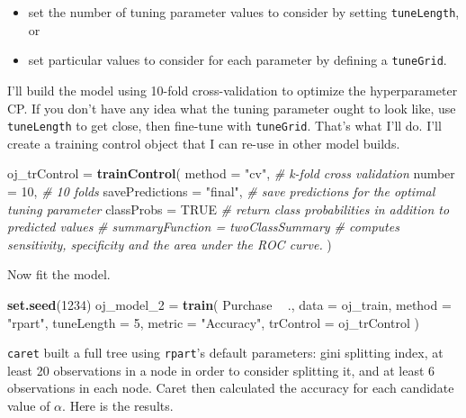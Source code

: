 \documentclass[
]{book}
\newenvironment{Shaded}{\begin{snugshade}}{\end{snugshade}}
\newcommand{\CommentTok}[1]{\textcolor[rgb]{0.56,0.35,0.01}{\textit{#1}}}
\newcommand{\DataTypeTok}[1]{\textcolor[rgb]{0.13,0.29,0.53}{#1}}
\newcommand{\DecValTok}[1]{\textcolor[rgb]{0.00,0.00,0.81}{#1}}
\newcommand{\KeywordTok}[1]{\textcolor[rgb]{0.13,0.29,0.53}{\textbf{#1}}}
\newcommand{\NormalTok}[1]{#1}
\newcommand{\OperatorTok}[1]{\textcolor[rgb]{0.81,0.36,0.00}{\textbf{#1}}}
\newcommand{\OtherTok}[1]{\textcolor[rgb]{0.56,0.35,0.01}{#1}}
\newcommand{\StringTok}[1]{\textcolor[rgb]{0.31,0.60,0.02}{#1}}
\providecommand{\tightlist}{%
  \setlength{\itemsep}{0pt}\setlength{\parskip}{0pt}}
\begin{document}
\begin{itemize}
\tightlist
\item
  set the number of tuning parameter values to consider by setting \texttt{tuneLength}, or
\item
  set particular values to consider for each parameter by defining a \texttt{tuneGrid}.
\end{itemize}

I'll build the model using 10-fold cross-validation to optimize the hyperparameter CP. If you don't have any idea what the tuning parameter ought to look like, use \texttt{tuneLength} to get close, then fine-tune with \texttt{tuneGrid}. That's what I'll do. I'll create a training control object that I can re-use in other model builds.

\begin{Shaded}
\begin{Highlighting}[]
\NormalTok{oj_trControl =}\StringTok{ }\KeywordTok{trainControl}\NormalTok{(}
   \DataTypeTok{method =} \StringTok{"cv"}\NormalTok{,  }\CommentTok{# k-fold cross validation}
   \DataTypeTok{number =} \DecValTok{10}\NormalTok{,  }\CommentTok{# 10 folds}
   \DataTypeTok{savePredictions =} \StringTok{"final"}\NormalTok{,       }\CommentTok{# save predictions for the optimal tuning parameter}
   \DataTypeTok{classProbs =} \OtherTok{TRUE}  \CommentTok{# return class probabilities in addition to predicted values}
\CommentTok{#   summaryFunction = twoClassSummary  # computes sensitivity, specificity and the area under the ROC curve.}
\NormalTok{   )}
\end{Highlighting}
\end{Shaded}

Now fit the model.

\begin{Shaded}
\begin{Highlighting}[]
\KeywordTok{set.seed}\NormalTok{(}\DecValTok{1234}\NormalTok{)}
\NormalTok{oj_model_}\DecValTok{2}\NormalTok{ =}\StringTok{ }\KeywordTok{train}\NormalTok{(}
\NormalTok{   Purchase }\OperatorTok{~}\StringTok{ }\NormalTok{., }
   \DataTypeTok{data =}\NormalTok{ oj_train, }
   \DataTypeTok{method =} \StringTok{"rpart"}\NormalTok{,}
   \DataTypeTok{tuneLength =} \DecValTok{5}\NormalTok{,}
   \DataTypeTok{metric =} \StringTok{"Accuracy"}\NormalTok{,}
   \DataTypeTok{trControl =}\NormalTok{ oj_trControl}
\NormalTok{   )}
\end{Highlighting}
\end{Shaded}

\texttt{caret} built a full tree using \texttt{rpart}'s default parameters: gini splitting index, at least 20 observations in a node in order to consider splitting it, and at least 6 observations in each node. Caret then calculated the accuracy for each candidate value of \(\alpha\). Here is the results.
\end{document}
